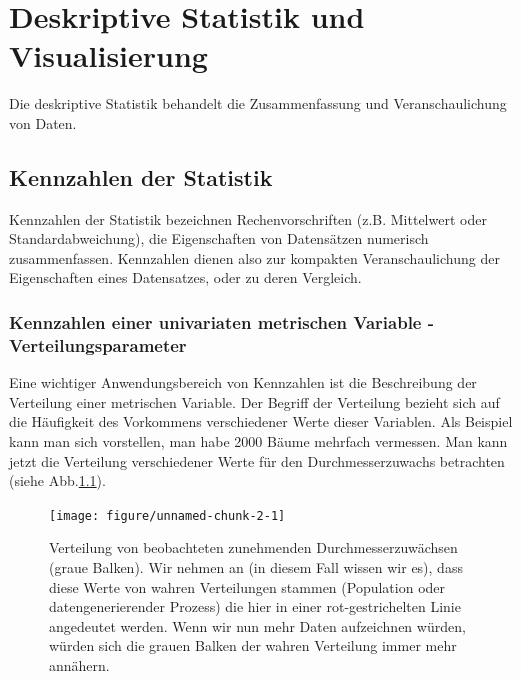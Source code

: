 \documentclass[a4paper,twoside]{tufte-book}\usepackage[]{graphicx}\usepackage[]{color}
\begin{document}
	
	\chapter{Deskriptive Statistik und Visualisierung}\label{ch: deskriptive Statistik}
	
	Die deskriptive Statistik behandelt die Zusammenfassung und Veranschaulichung von Daten.
	
	\section{Kennzahlen der Statistik}
	
	Kennzahlen der Statistik bezeichnen Rechenvorschriften (z.B. Mittelwert oder Standardabweichung), die Eigenschaften von Datensätzen numerisch zusammenfassen. Kennzahlen dienen also zur kompakten Veranschaulichung der Eigenschaften eines Datensatzes, oder zu deren Vergleich.
	
	\subsection{Kennzahlen einer univariaten metrischen Variable - Verteilungsparameter}
	
	Eine wichtiger Anwendungsbereich von Kennzahlen ist die Beschreibung der Verteilung einer metrischen Variable. Der Begriff der Verteilung bezieht sich auf die Häufigkeit des Vorkommens verschiedener Werte dieser Variablen. Als Beispiel kann man sich vorstellen, man habe 2000 Bäume mehrfach vermessen. Man kann jetzt die Verteilung verschiedener Werte für den Durchmesserzuwachs betrachten (siehe Abb.\ref{fig: data distribution}).


\begin{figure}[htbp]
\begin{center}
\begin{Schunk}

\texttt{[image: figure/unnamed-chunk-2-1]} \end{Schunk}
\caption{Verteilung von beobachteten zunehmenden Durchmesserzuwächsen (graue Balken). Wir nehmen an (in diesem Fall wissen wir es), dass diese Werte von wahren Verteilungen stammen (Population oder datengenerierender Prozess) die hier in einer rot-gestrichelten Linie angedeutet werden. Wenn wir nun mehr Daten aufzeichnen würden, würden sich die grauen Balken der wahren Verteilung immer mehr annähern.}
\label{fig: data distribution}
\end{center}
\end{figure}
\end{document}
